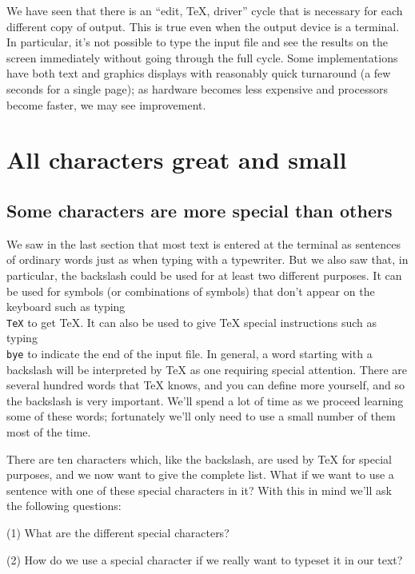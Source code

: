 We have seen that there is an ``edit, \TeX{}, driver'' cycle that 
is necessary for each different copy of output.  This is true 
even when the output device is a terminal.  In particular, it's 
not possible to type the input file and see the results on the 
screen immediately without going through the full cycle.  Some 
implementations have both text and graphics displays with 
reasonably quick turnaround (a few seconds for a single page); as 
hardware becomes less expensive and processors become faster, we 
may see improvement. 






\section{All characters great and small} 

\subsection{Some characters are more special than others} 

We saw in the last section that most text is entered at the 
terminal as sentences of ordinary words just as when typing with 
a typewriter. But we also saw that, in particular, the backslash 
could be used for at least two different purposes. It can be 
used for symbols (or combinations of symbols) that don't appear 
on the keyboard such as typing {\tt \\TeX} to get \TeX\null. It 
can also be used to give \TeX{} special instructions such as 
typing {\tt \\bye} to indicate the end of the input file. In 
general, a word starting with a backslash will be interpreted by 
\TeX{} as one requiring special attention. There are several 
hundred words that \TeX{} knows, and you can define more 
yourself, and so the backslash is very important. We'll spend a 
lot of time as we proceed learning some of these words; 
fortunately we'll only need to use a small number of them most of 
the time. 

There are ten characters which, like the backslash, are used 
by \TeX{} for special purposes, and we now want to give the 
complete list. 
What if we want to use a sentence with one of these 
special characters in it? With this in mind we'll ask the following 
questions: 
\beginlist
\item{(1)} What are the different special characters? 
\item{(2)} How do we use a special character if we really want to 
\endlist
typeset it in our text? 

